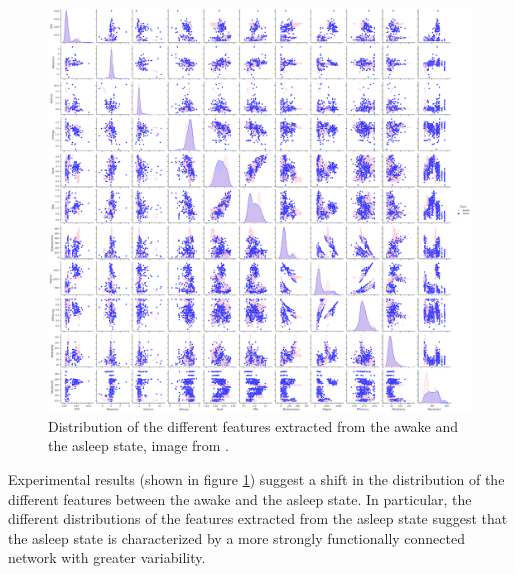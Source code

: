 \begin{figure}
  \centering
  \includegraphics[width=\textwidth]{experimental-feature-distribution}
  \caption{Distribution of the different features extracted from the awake and the asleep state, image from \cite{sleep-correlates}.}
  \label{fig:experimental-feature-distribution}
\end{figure}

Experimental results (shown in figure \ref{fig:experimental-feature-distribution}) suggest a shift in the distribution of the different features between the awake and the asleep state.
In particular, the different distributions of the features extracted from the asleep state suggest that the asleep state is characterized by a more strongly functionally connected network with greater variability.\\

